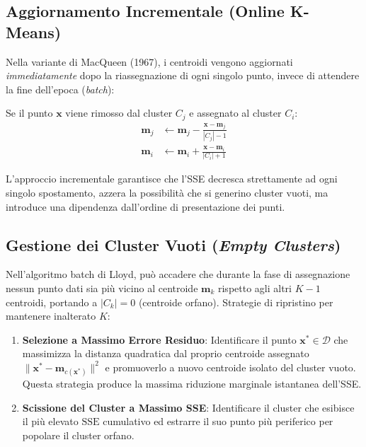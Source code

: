 \subsection{Aggiornamento Incrementale (Online K-Means)}

Nella variante di MacQueen (1967), i centroidi vengono aggiornati \textit{immediatamente} dopo la riassegnazione di ogni singolo punto, invece di attendere la fine dell'epoca (\textit{batch}):
\begin{property}
Se il punto $\mathbf{x}$ viene rimosso dal cluster $C_j$ e assegnato al cluster $C_i$:
\begin{align}
    \mathbf{m}_j &\leftarrow \mathbf{m}_j - \frac{\mathbf{x} - \mathbf{m}_j}{|C_j| - 1} \label{eq:dm-macqueen-remove} \\
    \mathbf{m}_i &\leftarrow \mathbf{m}_i + \frac{\mathbf{x} - \mathbf{m}_i}{|C_i| + 1} \label{eq:dm-macqueen-add}
\end{align}
\end{property}
L'approccio incrementale garantisce che l'SSE decresca strettamente ad ogni singolo spostamento, azzera la possibilità che si generino cluster vuoti, ma introduce una dipendenza dall'ordine di presentazione dei punti.

\subsection{Gestione dei Cluster Vuoti (\textit{Empty Clusters})}

Nell'algoritmo batch di Lloyd, può accadere che durante la fase di assegnazione nessun punto dati sia più vicino al centroide $\mathbf{m}_k$ rispetto agli altri $K-1$ centroidi, portando a $|C_k| = 0$ (centroide orfano).
Strategie di ripristino per mantenere inalterato $K$:
\begin{enumerate}
    \item \textbf{Selezione a Massimo Errore Residuo}: Identificare il punto $\mathbf{x}^* \in \mathcal{D}$ che massimizza la distanza quadratica dal proprio centroide assegnato $\|\mathbf{x}^* - \mathbf{m}_{c(\mathbf{x}^*)}\|^2$ e promuoverlo a nuovo centroide isolato del cluster vuoto. Questa strategia produce la massima riduzione marginale istantanea dell'SSE.
    \item \textbf{Scissione del Cluster a Massimo SSE}: Identificare il cluster che esibisce il più elevato $\mathrm{SSE}$ cumulativo ed estrarre il suo punto più periferico per popolare il cluster orfano.
\end{enumerate}


